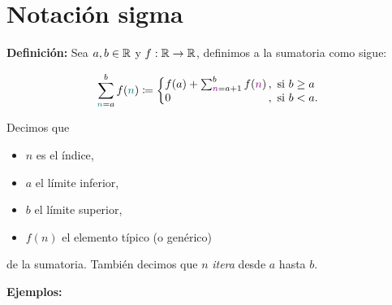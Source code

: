 \part*{Notación sigma}

\textbf{Definición:} Sea $a,b\in \mathbb{R}$ y $f: \mathbb{R}\to \mathbb{R}$, definimos a la sumatoria como sigue:

\[
    \sum_{{\color{teal}n}=a}^{b} f({\color{teal}n}) \defined \left\{
    \begin{array}{@{}l@{\thinspace}l}
    f(a) + \sum_{{\color{violet}n}=a+1}^{b} f({\color{violet}n}) &,  \ \text{si}  \ b\geq a\\
    0 &,  \ \text{si}  \ b<a.
    \end{array} \right. \]

Decimos que
\begin{itemize}
  \item $n$ es el índice,
  \item $a$ el límite inferior,
  \item $b$ el límite superior,
  \item $f(n)$ el elemento típico (o genérico)
\end{itemize}
de la sumatoria. También decimos que $n$ \textit{itera} desde $a$ hasta $b$.

\textbf{Ejemplos:}

